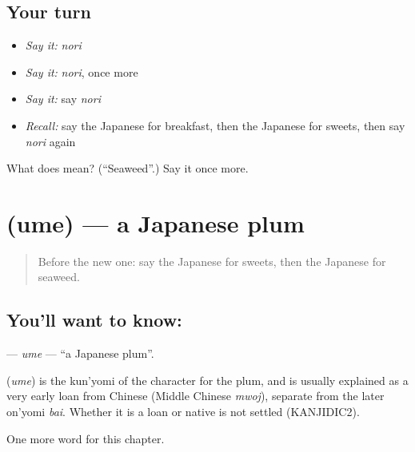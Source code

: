 \subsection*{Your turn}
\begin{itemize}
\raggedright
  \item \emph{Say it:} \emph{nori}
  \item \emph{Say it:} \emph{nori}, once more
  \item \emph{Say it:} say \emph{nori}
  \item \emph{Recall:} say the Japanese for breakfast, then the Japanese for sweets, then say \emph{nori} again
\end{itemize}

\begin{tcolorbox}[breakable,colback=teal!4,colframe=teal!35!black,title={Before you move on}]
What does  mean? (\textquotedblleft{}Seaweed\textquotedblright{}.) Say it once more.
\end{tcolorbox}
\section[\texorpdfstring{\ja{うめ} (ume)}{うめ (ume)}]{ (ume) — a Japanese plum}

\label{lesson:JA-C36-ume}



\begin{quote}
Before the new one: say the Japanese for sweets, then the Japanese for seaweed.
\end{quote}

\subsection*{You'll want to know: }
\textbf{} — \emph{ume} — \textquotedblleft{}a Japanese plum\textquotedblright{}.

\begin{cousinweb}
\textbf{} (\emph{ume}) is the kun'yomi of the character for the plum, and is usually explained as a very early loan from Chinese (Middle Chinese \emph{mwoj}), separate from the later on'yomi \emph{bai}. Whether it is a loan or native is not settled (KANJIDIC2).
\end{cousinweb}

\begin{grammarlens}[title={What you've built}]
One more word for this chapter.
\end{grammarlens}

